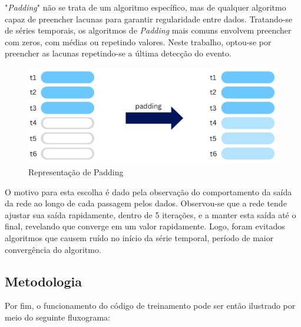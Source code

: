 "\textit{Padding}" não se trata de um algoritmo específico, mas de qualquer algoritmo capaz de preencher lacunas para garantir regularidade entre dados. Tratando-se de séries temporais, os algoritmos de \textit{Padding} mais comuns envolvem preencher com zeros, com médias ou repetindo valores. Neste trabalho, optou-se por preencher as lacunas repetindo-se a última detecção do evento. 

\begin{figure}[ht]
    \centering
    \includegraphics[scale=0.5]{tg1/figuras/padding.png}
    \caption{Representação de Padding}
    \label{fig:padding}
\end{figure}


O motivo para esta escolha é dado pela observação do comportamento da saída da rede ao longo de cada passagem pelos dados. Observou-se que a rede tende ajustar sua saída rapidamente, dentro de 5 iterações, e a manter esta saída até o final, revelando que converge em um valor rapidamente. Logo, foram evitados algoritmos que causem ruído no início da série temporal, período de maior convergência do algoritmo.

\subsection{Metodologia}

Por fim, o funcionamento do código de treinamento pode ser então ilustrado por meio do seguinte fluxograma:


